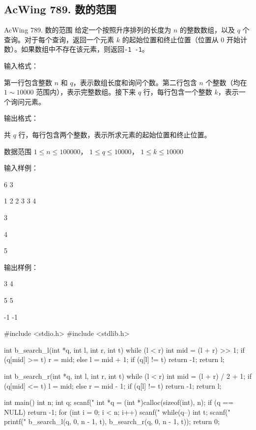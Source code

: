 \subsection{AcWing 789. 数的范围}
\begin{titledbox}{AcWing 789. 数的范围}
给定一个按照升序排列的长度为 $n$ 的整数数组，以及 $q$ 个查询。对于每个查询，返回一个元素 $k$ 的起始位置和终止位置（位置从 $0$ 开始计数）。如果数组中不存在该元素，则返回\lstinline{-1 -1}。

输入格式：

第一行包含整数 $n$ 和 $q$，表示数组长度和询问个数。第二行包含 $n$ 个整数（均在 $1 \sim 10000$ 范围内），表示完整数组。接下来 $q$ 行，每行包含一个整数 $k$，表示一个询问元素。

输出格式：

共 $q$ 行，每行包含两个整数，表示所求元素的起始位置和终止位置。

数据范围
$1 \le n \le 100000$，
$1 \le q \le 10000$，
$1 \le k \le 10000$

输入样例：

6 3

1 2 2 3 3 4

3

4

5

输出样例：

3 4

5 5

-1 -1
\end{titledbox}


\begin{mycpptwocol}
#include <stdio.h>
#include <stdlib.h>

int b_search_l(int *q, int l,
               int r, int t) {
    while (l < r) {
        int mid = (l + r) >> 1;
        if (q[mid] >= t) {
            r = mid;
        } else {
            l = mid + 1;
        }
    }
    if (q[l] != t) {
        return -1;
    }
    return l;
}

int b_search_r(int *q, int l,
               int r, int t) {
    while (l < r) {
        int mid = (l + r) / 2 + 1;
        if (q[mid] <= t) {
            l = mid;
        } else {
            r = mid - 1;
        }
    }
    if (q[l] != t) {
        return -1;
    }
    return l;
}

int main()
{
    int n;
    int q;
    scanf("%
    int *q = (int *)calloc(sizeof(int), n);
    if (q == NULL) {
        return -1;
    }
    for (int i = 0; i < n; i++) {
        scanf("%
    }
    while(q--) {
        int t;
        scanf("%
        printf("%
        b_search_l(q, 0, n - 1, t),
        b_search_r(q, 0, n - 1, t));
    }
    return 0;
}
\end{mycpptwocol}

